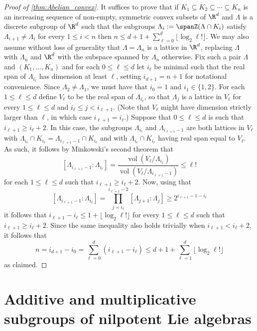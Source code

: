 \begin{proof}[Proof of \cref{thm:Abelian_convex}]
It suffices to prove that if $K_1\subseteq K_2\subseteq \cdots \subseteq K_n$ is an increasing sequence of non-empty, symmetric convex subsets of $\R^d$ and $\Lambda$ is a discrete subgroup of $\R^d$ such that the subgroups $\Lambda_i:=\spanZ( \Lambda \cap K_i)$ satisfy $\Lambda_{i+1}\neq \Lambda_i$ for every $1\leq i < n$ then $n \leq d+1+\sum_{\ell=0}^d \lfloor \log_2 \ell! \rfloor$. 
We may also assume without loss of generality that $\Lambda=\Lambda_n$ is a lattice in $\R^d$, replacing $\Lambda$ with $\Lambda_n$ and $\R^d$ with the subspace spanned by $\Lambda_n$ otherwise.
Fix such a pair $\Lambda$ and $(K_1,\ldots,K_n)$ and for each $0\leq \ell \leq d$ let $i_\ell$ be minimal such that the real span of $\Lambda_{i_\ell}$ has dimension at least $\ell$, setting $i_{d+1}=n+1$ for notational convenience. 
Since $\Lambda_2\neq \Lambda_1$, we must have that $i_0=1$ and $i_1 \in \{1,2\}$. For each $1\leq \ell \leq d$ define $V_\ell$ to be the real span of $\Lambda_{i_\ell}$, so that $\Lambda_j$ is a lattice in $V_\ell$ for every $1\leq \ell \leq d$ and $i_\ell \leq j <i_{\ell+1}$. (Note that $V_\ell$ might have dimension strictly larger than $\ell$, in which case $i_{\ell+1}=i_\ell$.) Suppose that $0\leq \ell \leq d$ is such that $i_{\ell+1} \geq i_\ell + 2$. In this case, the subgroups $\Lambda_{i_\ell}$ and $\Lambda_{i_{\ell+1}-1}$ are both lattices in $V_\ell$ with $\Lambda_{i_\ell} \cap K_{i_\ell}=\Lambda_{i_{\ell+1}-1} \cap K_{i_\ell}$ and with $\Lambda_{i_\ell}\cap K_{i_\ell}$ having real span equal to $V_\ell$. As such, it follows by Minkowski's second theorem that
\[
[ \Lambda_{i_{\ell+1}-1}: \Lambda_{i_\ell}] = \frac{\operatorname{vol}(V_\ell/\Lambda_{i_\ell})}{\operatorname{vol}(V_\ell/\Lambda_{i_{\ell+1}-1})} \leq \ell!
\]
for each $1\leq \ell \leq d$ such that $i_{\ell+1} \geq i_\ell+2$.
Now, using that
\[
[ \Lambda_{i_{\ell+1}-1}: \Lambda_{i_\ell}] = \prod_{j=i_\ell}^{i_{\ell+1}-2} [ \Lambda_{j+1}: \Lambda_{j}] \geq 2^{i_{\ell+1}-1-i_\ell}
\]
it follows that $i_{\ell+1}-i_\ell \leq 1+\lfloor\log_2 \ell! \rfloor$
for every $1\leq \ell \leq d$ such that $i_{\ell+1} \geq i_\ell+2$. Since the same inequality also holds trivially when $i_{\ell+1} < i_\ell+2$, it follows that
\[
n = i_{d+1}-i_0 = \sum_{\ell=0}^d (i_{\ell+1}-i_\ell) \leq d+1 + \sum_{\ell=1}^d \lfloor \log_2 \ell!\rfloor
\]
as claimed.
%
\end{proof}

\section{Additive and multiplicative subgroups of nilpotent Lie algebras}
\label{sec:nilpotent_lattices}
%





